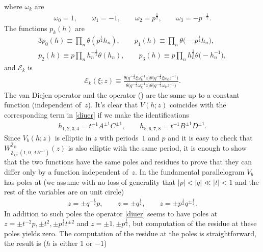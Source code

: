\documentclass[a4paper,12pt]{article}
\begin{document}
where $\omega_k$ are
\begin{gather*}
 \omega_0=1 , \qquad \omega_1=-1 , \qquad \omega_2=p^\frac12 ,\qquad \omega_3=-p^{-\frac12} .
\end{gather*}
The functions $p_k(h)$ are
\begin{alignat*}{3}
  p_0(h)\equiv \prod_n \theta(p^\frac12 h_n) , \qquad  p_1(h)\equiv \prod_n \theta\big({-}p^\frac12 h_n\big) , \\
  p_2(h)\equiv p\prod_n h_n^{-\frac12}\theta(h_n) ,\qquad  p_3(h)\equiv p\prod_n h_n^{\frac12}\theta\big({-}h_n^{-1}\big) ,
\end{alignat*}
and $\mathcal{E}_k$ is
\begin{gather*}
 \mathcal{E}_k(\xi;z)\equiv\frac{\theta\big(q^{-\frac12} \xi \omega_k^{-1} z\big)\theta\big(q^{-\frac12} \xi \omega_k z^{-1}\big)}{\theta\big(q^{-\frac12}\omega_k^{-1} z\big)\theta\big(q^{-\frac12} \omega_k z^{-1}\big)} .
\end{gather*}
The van Diejen operator and the operator () are the same up to a constant function (independent of~$z$). It's clear that $V(h;z)$ coincides with the corresponding term in \eqref{diuer} if we make the identifications
\begin{gather*}
 h_{1,2,3,4}=t^{-1}A^{\pm1}C^{\pm1} , \qquad h_{5,6,7,8}=t^{-1}B^{\pm1}D^{\pm1} .
\end{gather*}
Since $V_b(h;z)$ is elliptic in $z$ with periods~$1$ and $p$ and it is easy to check that $W^{{\mathfrak J}_B}_{{\mathfrak J}_D, (1,0; AB^{-1})}(z)$ is also elliptic with the same period, it is enough to show that the two functions have the same poles and residues to prove that they can differ only by a function independent of~$z$. In the fundamental parallelogram $V_b$ has poles at (we assume with no loss of generality that $|p|<|q|\ll |t|<1$ and the rest of the variables are on unit circle)
\begin{gather*}
 z=\pm q^{-\frac12}p , \qquad z= \pm q^{\frac12}, \qquad z=\pm p^\frac12 q^{\pm\frac12}.
\end{gather*}
In addition to such poles the operator \eqref{diuer} seems to have poles at $z=\pm t^{-2}p , \pm t^2 , 	\pm p^\frac12 t^{\pm2}$ and $z=\pm1,\pm p^\frac12$, but computation of the residue at these poles yields zero. The computation of the residue at the poles is straightforward, the result is ($h$ is either $1$ or $-1$)
\end{document}
